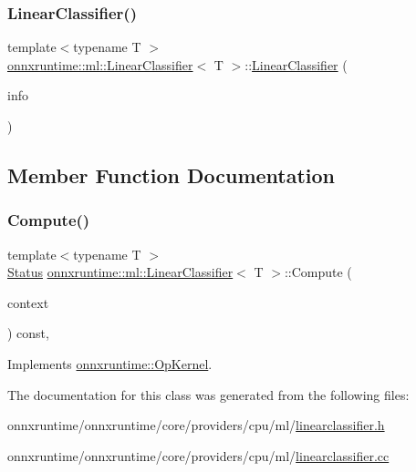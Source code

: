\subsubsection{\texorpdfstring{Linear\+Classifier()}{LinearClassifier()}}
{\footnotesize\ttfamily template$<$typename T $>$ \\
\mbox{\hyperlink{classonnxruntime_1_1ml_1_1LinearClassifier}{onnxruntime\+::ml\+::\+Linear\+Classifier}}$<$ T $>$\+::\mbox{\hyperlink{classonnxruntime_1_1ml_1_1LinearClassifier}{Linear\+Classifier}} (\begin{DoxyParamCaption}\item[{const \mbox{\hyperlink{classonnxruntime_1_1OpKernelInfo}{Op\+Kernel\+Info}} \&}]{info }\end{DoxyParamCaption})}



\subsection{Member Function Documentation}
\mbox{\label{classonnxruntime_1_1ml_1_1LinearClassifier_affe85ddee6d2dd79c389e77348bf2d94}} 
\subsubsection{\texorpdfstring{Compute()}{Compute()}}
{\footnotesize\ttfamily template$<$typename T $>$ \\
\mbox{\hyperlink{classonnxruntime_1_1common_1_1Status}{Status}} \mbox{\hyperlink{classonnxruntime_1_1ml_1_1LinearClassifier}{onnxruntime\+::ml\+::\+Linear\+Classifier}}$<$ T $>$\+::Compute (\begin{DoxyParamCaption}\item[{\mbox{\hyperlink{classonnxruntime_1_1OpKernelContext}{Op\+Kernel\+Context}} $\ast$}]{context }\end{DoxyParamCaption}) const\hspace{0.3cm}{\ttfamily [override]}, {\ttfamily [virtual]}}



Implements \mbox{\hyperlink{classonnxruntime_1_1OpKernel_a9eca8656a78b1b3ab9d3351a12798650}{onnxruntime\+::\+Op\+Kernel}}.



The documentation for this class was generated from the following files\+:\begin{DoxyCompactItemize}
\item 
onnxruntime/onnxruntime/core/providers/cpu/ml/\mbox{\hyperlink{linearclassifier_8h}{linearclassifier.\+h}}\item 
onnxruntime/onnxruntime/core/providers/cpu/ml/\mbox{\hyperlink{linearclassifier_8cc}{linearclassifier.\+cc}}\end{DoxyCompactItemize}

